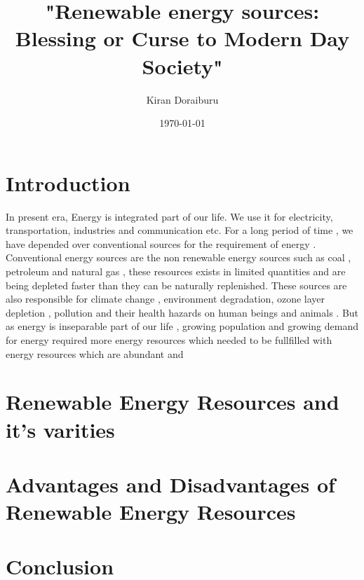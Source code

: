 \documentclass[two column]{article}
\title{"Renewable energy sources: Blessing or Curse to Modern Day Society"}
\author{Kiran Doraiburu}
\date{\today}
\begin{document}
\maketitle

\section{Introduction}
 In present era, Energy is integrated part of our life. We use it for electricity, transportation, industries and communication etc.  
For a long period of time , we have depended over conventional sources for the requirement of energy . Conventional energy sources are the non renewable energy sources such as coal , petroleum and natural gas , these resources exists in limited quantities and are being depleted faster than they can be naturally replenished.
These sources are also responsible for climate change , environment degradation, ozone layer depletion , pollution and their health hazards on human beings and animals .
But as energy is inseparable part of our life , growing population and growing demand for energy required more energy resources which needed to be fullfilled with energy resources which are abundant and 

\section{Renewable Energy Resources and it's varities}
\section{Advantages and Disadvantages of Renewable Energy Resources}
\section{Conclusion}
\end{document}
